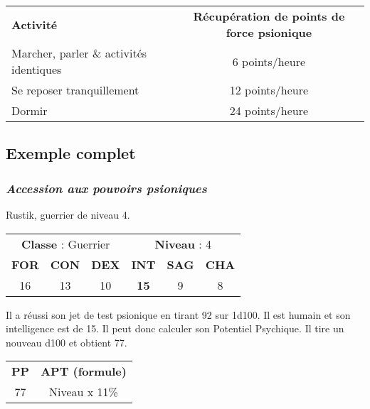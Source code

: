 \bigskip

\begin{tabular}{lp{0.3cm}c}
\textbf{Activité}                       && \textbf{Récupération de points de force psionique} \\
Marcher, parler \& activités identiques && 6 points/heure \\
Se reposer tranquillement               && 12 points/heure \\
Dormir                                  && 24 points/heure \\
\end{tabular}

\newpage
\subsection*{Exemple complet}
\label{exemple-complet}

\subsubsection*{\textit{Accession aux pouvoirs psioniques}}

Rustik, guerrier de niveau 4.
\bigskip

\begin{tabular}{cccccc}
\multicolumn{3}{c}{\textbf{Classe} : Guerrier} & \multicolumn{3}{c}{\textbf{Niveau} : 4} \\
\textbf{FOR} & \textbf{CON} & \textbf{DEX} & \textbf{INT} & \textbf{SAG} & \textbf{CHA} \\
16 & 13 & 10 & \textbf{15} & 9 & 8 \\
\end{tabular}

\bigskip

Il a réussi son jet de test psionique en tirant 92 sur 1d100. Il est humain et son intelligence est de 15. Il peut donc calculer son Potentiel Psychique. Il tire un nouveau d100 et obtient 77.

\bigskip

\begin{tabular}{cc}
\textbf{PP} & \textbf{APT (formule)}\\
77 & Niveau x 11\% \\
\end{tabular}

